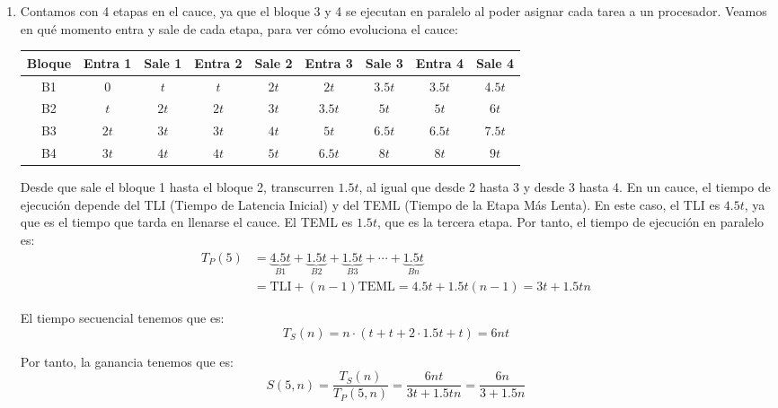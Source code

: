 \begin{ejercicio}
\begin{enumerate}
    \item
    Contamos con 4 etapas en el cauce, ya que el bloque 3 y 4 se ejecutan en paralelo al poder asignar cada tarea a un procesador.
    Veamos en qué momento entra y sale de cada etapa, para ver cómo evoluciona el cauce:
    \begin{table}[H]
        \begin{tabular}{|c|c|c|c|c|c|c|c|c|}
            \hline
            Bloque & Entra 1 & Sale 1 & Entra 2 & Sale 2 & Entra 3 & Sale 3 & Entra 4 & Sale 4 \\
            \hline
            B1 & 0 & $t$ & $t$ & $2t$ & $2t$ & $3.5t$ & 3.$5t$ & 4.$5t$ \\
            B2 & $t$ & $2t$ & $2t$ & $3t$ & $3.5t$ & $5t$ & $5t$ & $6t$ \\
            B3 & $2t$ & $3t$ & $3t$ & $4t$ & $5t$ & $6.5t$ & $6.5t$ & $7.5t$\\
            B4 & $3t$ & $4t$ & $4t$ & $5t$ & $6.5t$ & $8t$ & $8t$ & $9t$\\
            \hline
        \end{tabular}
    \end{table}
    Desde que sale el bloque 1 hasta el bloque 2, transcurren $1.5t$, al igual que desde 2 hasta 3 y desde 3 hasta 4. En un cauce,
    el tiempo de ejecución depende del TLI (Tiempo de Latencia Inicial) y del TEML (Tiempo de la Etapa Más Lenta). En este caso, el TLI es $4.5t$, ya que es el tiempo que tarda en llenarse el cauce.
    El TEML es $1.5t$, que es la tercera etapa. Por tanto, el tiempo de ejecución en paralelo es:
    \begin{align*}
        T_P(5) &= \underbrace{4.5t}_{B1} + \underbrace{1.5t}_{B2} + \underbrace{1.5t}_{B3} + \cdots + \underbrace{1.5t}_{Bn}\\
        &= \text{TLI} + (n-1)\text{TEML} = 4.5t + 1.5t(n-1) = 3t + 1.5tn
    \end{align*}

    El tiempo secuencial tenemos que es:
    \begin{equation*}
        T_S(n) = n\cdot (t+t+2\cdot 1.5t+t) = 6nt
    \end{equation*}

    Por tanto, la ganancia tenemos que es:
    \begin{equation*}
        S(5,n) = \dfrac{T_S(n)}{T_P(5,n)} = \dfrac{6nt}{3t + 1.5tn} = \dfrac{6n}{3 + 1.5n}
    \end{equation*}


\end{enumerate}
\end{ejercicio}
